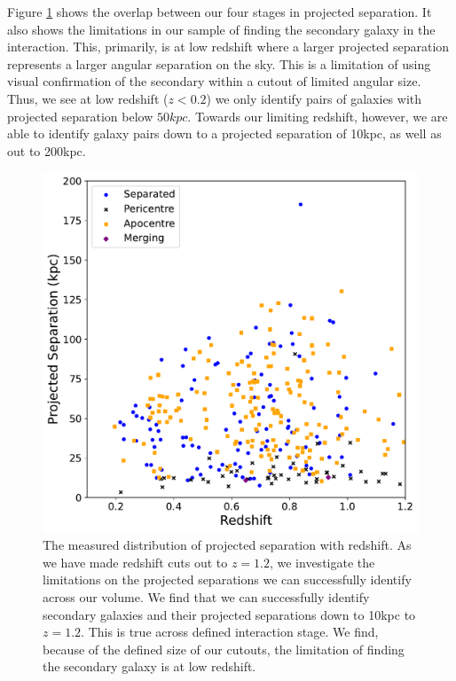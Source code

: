 Figure \ref{fig:proj-seps-limits} shows the overlap between our four stages in projected separation. It also shows the limitations in our sample of finding the secondary galaxy in the interaction. This, primarily, is at low redshift where a larger projected separation represents a larger angular separation on the sky. This is a limitation of using visual confirmation of the secondary within a cutout of limited angular size. Thus, we see at low redshift ($z < 0.2$) we only identify pairs of galaxies with projected separation below $50kpc$. Towards our limiting redshift, however, we are able to identify galaxy pairs down to a projected separation of 10kpc, as well as out to 200kpc. 

\begin{figure}
\centering
\includegraphics[width=\textwidth]{Chapter3/figures/redshift-proj-sep-diagnostic.pdf}
\caption[The measured distribution of projected separation with redshift.]{The measured distribution of projected separation with redshift. As we have made redshift cuts out to $z = 1.2$, we investigate the limitations on the projected separations we can successfully identify across our volume. We find that we can successfully identify secondary galaxies and their projected separations down to 10kpc to $z=1.2$. This is true across defined interaction stage. We find, because of the defined size of our cutouts, the limitation of finding the secondary galaxy is at low redshift.}
\label{fig:proj-seps-limits}
\end{figure}

